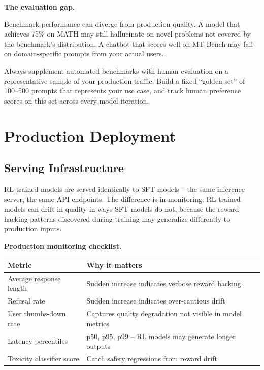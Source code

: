 \begin{chapterenv}
\begin{tipbox}
\textbf{The evaluation gap.}

Benchmark performance can diverge from production quality. A model that achieves 75\% on MATH may still hallucinate on novel problems not covered by the benchmark's distribution. A chatbot that scores well on MT-Bench may fail on domain-specific prompts from your actual users.

Always supplement automated benchmarks with human evaluation on a representative sample of your production traffic. Build a fixed ``golden set'' of 100--500 prompts that represents your use case, and track human preference scores on this set across every model iteration.
\end{tipbox}

\section{Production Deployment}

\subsection{Serving Infrastructure}

RL-trained models are served identically to SFT models -- the same inference server, the same API endpoints. The difference is in monitoring: RL-trained models can drift in quality in ways SFT models do not, because the reward hacking patterns discovered during training may generalize differently to production inputs.

\begin{infobox}
\textbf{Production monitoring checklist.}

\begin{tabular}{ll}
\toprule
Metric & Why it matters \\
\midrule
Average response length & Sudden increase indicates verbose reward hacking \\
Refusal rate & Sudden increase indicates over-cautious drift \\
User thumbs-down rate & Captures quality degradation not visible in model metrics \\
Latency percentiles & p50, p95, p99 -- RL models may generate longer outputs \\
Toxicity classifier score & Catch safety regressions from reward drift \\
\bottomrule
\end{tabular}
\end{infobox}


\end{chapterenv}
